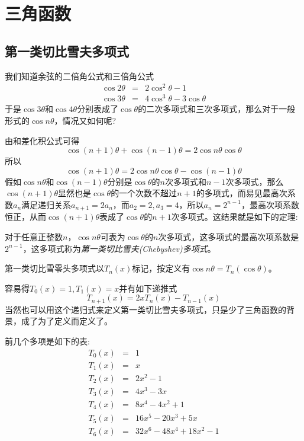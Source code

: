 
\section{三角函数}
\label{sec:triangle-function}

\subsection{第一类切比雪夫多项式}
\label{sec:first-chebyshev-polynome}

我们知道余弦的二倍角公式和三倍角公式
\begin{eqnarray*}
  \cos{2\theta} & = & 2\cos^2{\theta}-1 \\
  \cos{3\theta} & = & 4\cos^3{\theta}-3\cos{\theta}
\end{eqnarray*}
于是$\cos{3\theta}$和$\cos{4\theta}$分别表成了$\cos{\theta}$的二次多项式和三次多项式，那么对于一般形式的$\cos{n\theta}$，情况又如何呢?

由和差化积公式可得
\[ \cos{(n+1)\theta}+\cos{(n-1)\theta}=2\cos{n\theta}\cos{\theta} \]
所以
\[ \cos{(n+1)\theta}=2\cos{n\theta}\cos{\theta}-\cos{(n-1)\theta} \]
假如$\cos{n\theta}$和$\cos{(n-1)\theta}$分别是$\cos{\theta}$的$n$次多项式和$n-1$次多项式，那么$\cos{(n+1)\theta}$显然也是$\cos{\theta}$的一个次数不超过$n+1$的多项式，而易见最高次系数$a_n$满足递归关系$a_{n+1}=2a_n$，而$a_2=2,a_3=4$，所以$a_n=2^{n-1}$，最高次项系数恒正，从而$\cos{(n+1)\theta}$表成了$\cos{\theta}$的$n+1$次多项式。这结果就是如下的定理:

\begin{theorem}
  对于任意正整数$n$，$\cos{n\theta}$可表为$\cos{\theta}$的$n$次多项式，这多项式的最高次项系数是$2^{n-1}$，这多项式称为\emph{第一类切比雪夫(Chebyshev)多项式}。
\end{theorem}

第一类切比雪零头多项式以$T_n(x)$标记，按定义有$\cos{n\theta}=T_n(\cos{\theta})$。

容易得$T_0(x)=1,T_1(x)=x$并有如下递推式
\begin{equation}
  \label{eq:first-chebyshev-polynome-recursion}
  T_{n+1}(x)=2xT_n(x)-T_{n-1}(x)
\end{equation}
当然也可以用这个递归式来定义第一类切比雪夫多项式，只是少了三角函数的背景，成了为了定义而定义了。

前几个多项是如下的表:
\begin{eqnarray*}
  T_0(x) & = & 1 \\
  T_1(x) & = & x \\
  T_2(x) & = & 2x^2-1 \\
  T_3(x) & = & 4x^3-3x \\
  T_4(x) & = & 8x^4-4x^2+1 \\
  T_5(x) & = & 16x^5-20x^3+5x \\
  T_6(x) & = & 32x^6-48x^4+18x^2-1
\end{eqnarray*}

